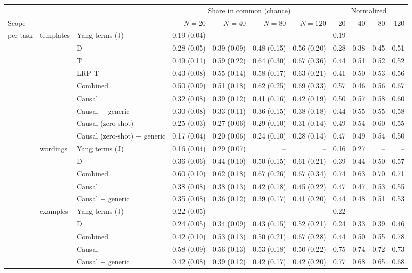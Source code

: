 \begin{tabular}{@{}lllrrrrrrrr@{}}
\toprule
& & & \multicolumn{4}{c}{Share in common (chance)} & \multicolumn{4}{c}{Normalized} \\
\cmidrule(lr){4-7} \cmidrule(lr){8-11}
Scope & & & $N=20$ & $N=40$ & $N=80$ & $N=120$ & 20 & 40 & 80 & 120 \\
\midrule
per task & templates & Yang terms (J) & 0.19 (0.04) & -- & -- & -- & 0.19 & -- & -- & -- \\
 &  & D & 0.28 (0.05) & 0.39 (0.09) & 0.48 (0.15) & 0.56 (0.20) & 0.28 & 0.38 & 0.45 & 0.51 \\
 &  & T & 0.49 (0.11) & 0.59 (0.22) & 0.64 (0.30) & 0.67 (0.36) & 0.44 & 0.51 & 0.52 & 0.52 \\
 &  & LRP-T & 0.43 (0.08) & 0.55 (0.14) & 0.58 (0.17) & 0.63 (0.21) & 0.41 & 0.50 & 0.53 & 0.56 \\
 &  & Combined & 0.50 (0.09) & 0.51 (0.18) & 0.62 (0.25) & 0.69 (0.33) & 0.57 & 0.46 & 0.56 & 0.67 \\
 &  & Causal & 0.32 (0.08) & 0.39 (0.12) & 0.41 (0.16) & 0.42 (0.19) & 0.50 & 0.57 & 0.58 & 0.60 \\
 &  & Causal $-$ generic & 0.30 (0.08) & 0.33 (0.11) & 0.36 (0.15) & 0.38 (0.18) & 0.44 & 0.55 & 0.55 & 0.58 \\
 &  & Causal (zero-shot) & 0.25 (0.03) & 0.27 (0.06) & 0.29 (0.10) & 0.31 (0.14) & 0.49 & 0.54 & 0.60 & 0.55 \\
 &  & Causal (zero-shot) $-$ generic & 0.17 (0.04) & 0.20 (0.06) & 0.24 (0.10) & 0.28 (0.14) & 0.47 & 0.49 & 0.54 & 0.50 \\
\addlinespace
 & wordings & Yang terms (J) & 0.16 (0.04) & 0.29 (0.07) & -- & -- & 0.16 & 0.27 & -- & -- \\
 &  & D & 0.36 (0.06) & 0.44 (0.10) & 0.50 (0.15) & 0.61 (0.21) & 0.39 & 0.44 & 0.50 & 0.57 \\
 &  & Combined & 0.60 (0.10) & 0.62 (0.18) & 0.67 (0.26) & 0.67 (0.34) & 0.74 & 0.63 & 0.70 & 0.71 \\
 &  & Causal & 0.38 (0.08) & 0.38 (0.13) & 0.42 (0.18) & 0.45 (0.22) & 0.47 & 0.47 & 0.53 & 0.55 \\
 &  & Causal $-$ generic & 0.35 (0.08) & 0.36 (0.12) & 0.39 (0.17) & 0.41 (0.20) & 0.44 & 0.48 & 0.51 & 0.53 \\
\addlinespace
 & examples & Yang terms (J) & 0.22 (0.05) & -- & -- & -- & 0.22 & -- & -- & -- \\
 &  & D & 0.24 (0.05) & 0.34 (0.09) & 0.43 (0.15) & 0.52 (0.21) & 0.24 & 0.33 & 0.39 & 0.46 \\
 &  & Combined & 0.42 (0.10) & 0.53 (0.13) & 0.50 (0.21) & 0.67 (0.28) & 0.44 & 0.50 & 0.55 & 0.78 \\
 &  & Causal & 0.58 (0.09) & 0.56 (0.13) & 0.53 (0.18) & 0.50 (0.22) & 0.75 & 0.74 & 0.72 & 0.73 \\
 &  & Causal $-$ generic & 0.42 (0.08) & 0.39 (0.12) & 0.42 (0.17) & 0.42 (0.20) & 0.77 & 0.68 & 0.65 & 0.68 \\
\bottomrule
\end{tabular}
